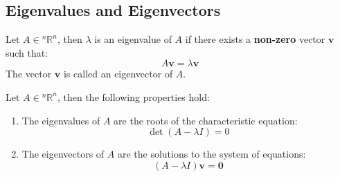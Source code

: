 \documentclass[11pt]{article}
\begin{document}
\subsection{Eigenvalues and Eigenvectors}
\begin{definition}
    Let $A \in {^n\mathbb{R}^n}$, then $\lambda$ is an eigenvalue of $A$ if there exists a \textbf{non-zero} vector $\textbf{v}$ such that:
    \begin{equation}
        A\textbf{v} = \lambda \textbf{v}
    \end{equation}
    The vector $\textbf{v}$ is called an eigenvector of $A$.
\end{definition}
\begin{theorem}
    Let $A \in {^n\mathbb{R}^n}$, then the following properties hold:
    \begin{enumerate}
        \item The eigenvalues of $A$ are the roots of the characteristic equation:
        \begin{equation}
            \det(A - \lambda I) = 0
        \end{equation}
        \item The eigenvectors of $A$ are the solutions to the system of equations:
        \begin{equation}
            (A - \lambda I)\textbf{v} = \textbf{0}
        \end{equation}
    \end{enumerate}
\end{theorem}
\end{document}
